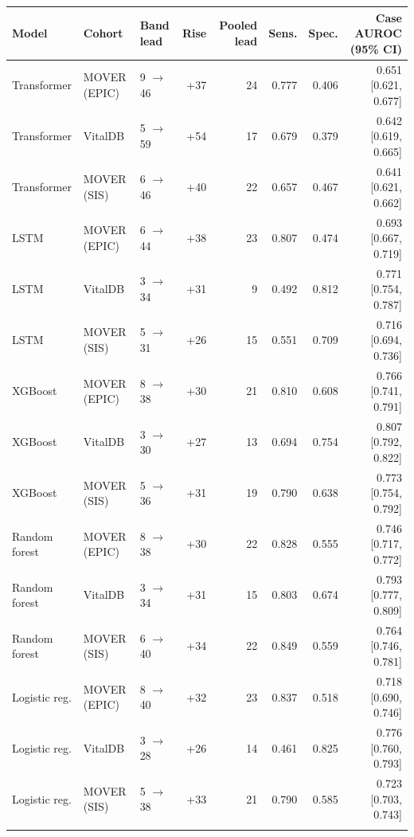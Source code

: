 \begin{table}[H]
\vspace{0.4em}
\centering\footnotesize
\begin{tabular}{@{}lllrrrrr@{}}
\toprule\noalign{}
Model & Cohort & Band lead & Rise & Pooled lead & Sens. & Spec. & Case AUROC (95\% CI) \\
\midrule\noalign{}
\bottomrule\noalign{}
Transformer & MOVER (EPIC) & 9 $\rightarrow$ 46 & +37 & 24 & 0.777 & 0.406 & 0.651 {[}0.621, 0.677{]} \\
Transformer & VitalDB & 5 $\rightarrow$ 59 & +54 & 17 & 0.679 & 0.379 & 0.642 {[}0.619, 0.665{]} \\
Transformer & MOVER (SIS) & 6 $\rightarrow$ 46 & +40 & 22 & 0.657 & 0.467 & 0.641 {[}0.621, 0.662{]} \\
LSTM & MOVER (EPIC) & 6 $\rightarrow$ 44 & +38 & 23 & 0.807 & 0.474 & 0.693 {[}0.667, 0.719{]} \\
LSTM & VitalDB & 3 $\rightarrow$ 34 & +31 & 9 & 0.492 & 0.812 & 0.771 {[}0.754, 0.787{]} \\
LSTM & MOVER (SIS) & 5 $\rightarrow$ 31 & +26 & 15 & 0.551 & 0.709 & 0.716 {[}0.694, 0.736{]} \\
XGBoost & MOVER (EPIC) & 8 $\rightarrow$ 38 & +30 & 21 & 0.810 & 0.608 & 0.766 {[}0.741, 0.791{]} \\
XGBoost & VitalDB & 3 $\rightarrow$ 30 & +27 & 13 & 0.694 & 0.754 & 0.807 {[}0.792, 0.822{]} \\
XGBoost & MOVER (SIS) & 5 $\rightarrow$ 36 & +31 & 19 & 0.790 & 0.638 & 0.773 {[}0.754, 0.792{]} \\
Random forest & MOVER (EPIC) & 8 $\rightarrow$ 38 & +30 & 22 & 0.828 & 0.555 & 0.746 {[}0.717, 0.772{]} \\
Random forest & VitalDB & 3 $\rightarrow$ 34 & +31 & 15 & 0.803 & 0.674 & 0.793 {[}0.777, 0.809{]} \\
Random forest & MOVER (SIS) & 6 $\rightarrow$ 40 & +34 & 22 & 0.849 & 0.559 & 0.764 {[}0.746, 0.781{]} \\
Logistic reg. & MOVER (EPIC) & 8 $\rightarrow$ 40 & +32 & 23 & 0.837 & 0.518 & 0.718 {[}0.690, 0.746{]} \\
Logistic reg. & VitalDB & 3 $\rightarrow$ 28 & +26 & 14 & 0.461 & 0.825 & 0.776 {[}0.760, 0.793{]} \\
Logistic reg. & MOVER (SIS) & 5 $\rightarrow$ 38 & +33 & 21 & 0.790 & 0.585 & 0.723 {[}0.703, 0.743{]} \\
\bottomrule\noalign{}
\end{tabular}
\end{table}

